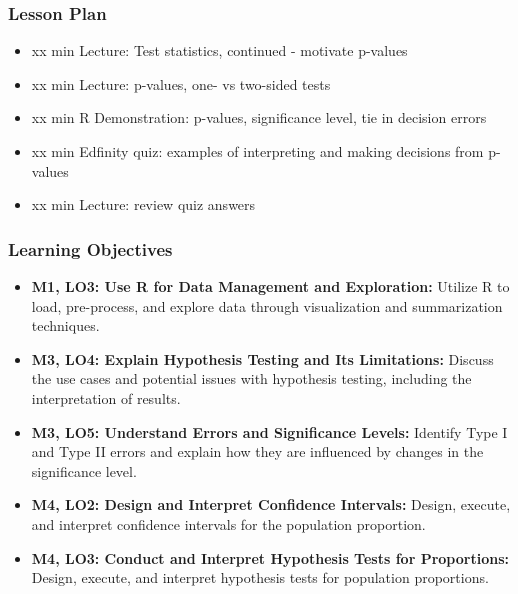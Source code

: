 \begin{frame}
    \frametitle{Lesson Plan}
    \begin{itemize}
        \item xx min Lecture: Test statistics, continued - motivate p-values
        \item xx min Lecture: p-values, one- vs two-sided tests
        \item xx min R Demonstration: p-values, significance level, tie in decision errors
        \item xx min Edfinity quiz: examples of interpreting and making decisions from p-values
        \item xx min Lecture: review quiz answers
    \end{itemize}
\end{frame}
            
\begin{frame}
    \frametitle{Learning Objectives}
    \begin{itemize}
        \item \textbf{M1, LO3: Use R for Data Management and Exploration:} Utilize R to load, pre-process, and explore data through visualization and summarization techniques.
        \item \textbf{M3, LO4: Explain Hypothesis Testing and Its Limitations:} Discuss the use cases and potential issues with hypothesis testing, including the interpretation of results.
        \item \textbf{M3, LO5: Understand Errors and Significance Levels:} Identify Type I and Type II errors and explain how they are influenced by changes in the significance level.
        \item \textbf{M4, LO2: Design and Interpret Confidence Intervals:} Design, execute, and interpret confidence intervals for the population proportion.
        \item \textbf{M4, LO3: Conduct and Interpret Hypothesis Tests for Proportions:} Design, execute, and interpret hypothesis tests for population proportions.
    \end{itemize}
\end{frame}
    
